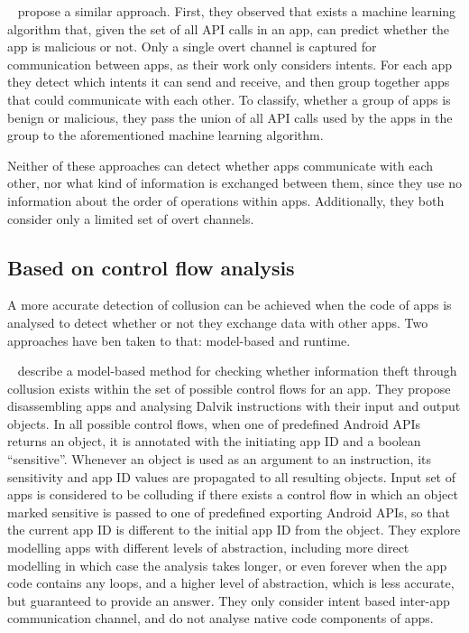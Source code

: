 \documentclass[article]{aaltoseries}
\renewcommand\gls\cgls
\begin{document}
\citeauthor{Chen2018}~\cite{Chen2018} propose a similar approach. First, they observed that exists a machine learning algorithm that, given the set of all API calls in an app, can predict whether the app is malicious or not. Only a single overt channel is captured for communication between apps, as their work only considers intents. For each app they detect which intents it can send and receive, and then group together apps that could communicate with each other. To classify, whether a group of apps is benign or malicious, they pass the union of all API calls used by the apps in the group to the aforementioned machine learning algorithm.

Neither of these approaches can detect whether apps communicate with each other, nor what kind of information is exchanged between them, since they use no information about the order of operations within apps. Additionally, they both consider only a limited set of overt channels.

\subsection{Based on control flow analysis}
\label{sec:flow}

A more accurate detection of collusion can be achieved when the code of apps is analysed to detect whether or not they exchange data with other apps. Two approaches have ben taken to that: model-based and runtime.

\citeauthor{Asavoae2018}~\cite{Asavoae2018} describe a model-based method for checking whether information theft through collusion exists within the set of possible control flows for an app. They propose disassembling apps and analysing Dalvik \gls{vm} instructions with their input and output objects. In all possible control flows, when one of predefined Android APIs returns an object, it is annotated with the initiating app ID and a boolean ``sensitive''. Whenever an object is used as an argument to an instruction, its sensitivity and app ID values are propagated to all resulting objects. Input set of apps is considered to be colluding if there exists a control flow in which an object marked sensitive is passed to one of predefined exporting Android APIs, so that the current app ID is different to the initial app ID from the object. They explore modelling apps with different levels of abstraction, including more direct modelling in which case the analysis takes longer, or even forever when the app code contains any loops, and a higher level of abstraction, which is less accurate, but guaranteed to provide an answer. They only consider intent based inter-app communication channel, and do not analyse native code components of apps.
\end{document}
